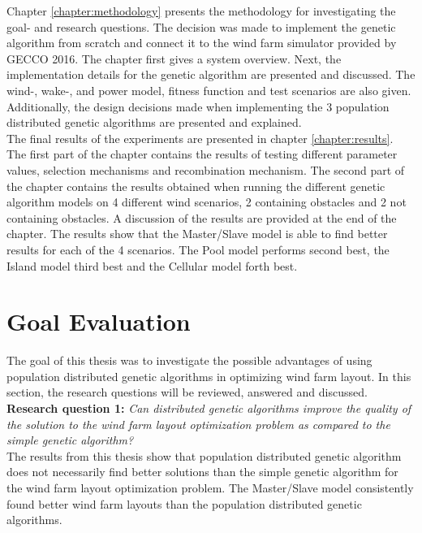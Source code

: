 \noindent Chapter \ref{chapter:methodology} presents the methodology for investigating the goal- and research questions. The decision was made to implement the genetic algorithm from scratch and connect it to the wind farm simulator provided by GECCO 2016. The chapter first gives a system overview. Next, the implementation details for the genetic algorithm are presented and discussed. The wind-, wake-, and power model, fitness function and test scenarios are also given. Additionally, the design decisions made when implementing the 3 population distributed genetic algorithms are presented and explained.\\


\noindent The final results of the experiments are presented in chapter \ref{chapter:results}. The first part of the chapter contains the results of testing different parameter values, selection mechanisms and recombination mechanism. The second part of the chapter contains the results obtained when running the different genetic algorithm models on 4 different wind scenarios, 2 containing obstacles and 2 not containing obstacles. A discussion of the results are provided at the end of the chapter. The results show that the Master/Slave model is able to find better results for each of the 4 scenarios. The Pool model performs second best, the Island model third best and the Cellular model forth best.\\


\section{Goal Evaluation}\label{section:goal evaluation}


\noindent The goal of this thesis was to investigate the possible advantages of using population distributed genetic algorithms in optimizing wind farm layout. In this section, the research questions will be reviewed, answered and discussed.\\


\noindent \textbf{Research question 1: } \textit{Can distributed genetic algorithms improve the quality of the solution to the wind farm layout optimization problem as compared to the simple genetic algorithm?}\\


\noindent The results from this thesis show that population distributed genetic algorithm does not necessarily find better solutions than the simple genetic algorithm for the wind farm layout optimization problem. The Master/Slave model consistently found better wind farm layouts than the population distributed genetic algorithms. \\


